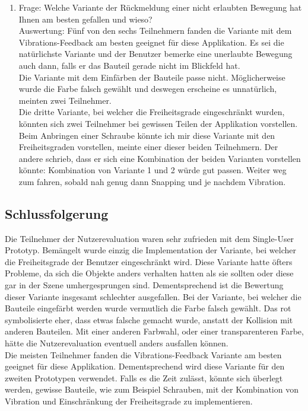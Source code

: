 \begin{enumerate} [itemsep=2pt]
	\item Frage: Welche Variante der Rückmeldung einer nicht erlaubten Bewegung hat Ihnen am besten gefallen und wieso? \\
	Auswertung: Fünf von den sechs Teilnehmern fanden die Variante mit dem Vibrations-Feedback am besten geeignet für diese Applikation. Es sei die natürlichste Variante und der Benutzer bemerke eine unerlaubte Bewegung auch dann, falls er das Bauteil gerade nicht im Blickfeld hat. \\
	Die Variante mit dem Einfärben der Bauteile passe nicht. Möglicherweise wurde die Farbe falsch gewählt und deswegen erscheine es unnatürlich, meinten zwei Teilnehmer. \\
	Die dritte Variante, bei welcher die Freiheitsgrade eingeschränkt wurden, könnten sich zwei Teilnehmer bei gewissen Teilen der Applikation vorstellen. \grqq Beim Anbringen einer Schraube könnte ich mir diese Variante mit den Freiheitsgraden vorstellen\grqq{}, meinte einer dieser beiden Teilnehmern. Der andere schrieb, dass er sich eine Kombination der beiden Varianten vorstellen könnte: \grqq Kombination von Variante 1 und 2 würde gut passen. Weiter weg zum fahren, sobald nah genug dann Snapping und je nachdem Vibration.\grqq{}
\end{enumerate}

\pagebreak
\subsection{Schlussfolgerung}
\label{ch:schlussfolgerung_t1}
Die Teilnehmer der Nutzerevaluation waren sehr zufrieden mit dem Single-User Prototyp. Bemängelt wurde einzig die Implementation der Variante, bei welcher die Freiheitsgrade der Benutzer eingeschränkt wird. Diese Variante hatte öfters Probleme, da sich die Objekte anders verhalten hatten als sie sollten oder diese gar in der Szene umhergesprungen sind. Dementsprechend ist die Bewertung dieser Variante insgesamt schlechter ausgefallen. Bei der Variante, bei welcher die Bauteile eingefärbt werden wurde vermutlich die Farbe falsch gewählt. Das rot symbolisierte eher, dass etwas falsche gemacht wurde, anstatt der Kollision mit anderen Bauteilen. Mit einer anderen Farbwahl, oder einer transparenteren Farbe, hätte die Nutzerevaluation eventuell anders ausfallen können. \\

\noindent Die meisten Teilnehmer fanden die Vibrations-Feedback Variante am besten geeignet für diese Applikation. Dementsprechend wird diese Variante für den zweiten Prototypen verwendet. Falls es die Zeit zulässt, könnte sich überlegt werden, gewisse Bauteile, wie zum Beispiel Schrauben, mit der Kombination von Vibration und Einschränkung der Freiheitsgrade zu implementieren.


